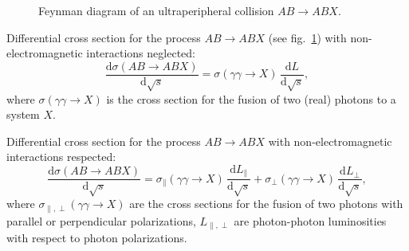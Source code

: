 \documentclass[a4paper,12pt]{article}
\begin{document}
\begin{figure}[tbh]
  \centering
  \caption{Feynman diagram of an ultraperipheral collision $AB \to ABX$.}
  \label{f:upc}
\end{figure}
Differential cross section for the process $AB \to ABX$ (see fig.~\ref{f:upc})
with non-electromagnetic interactions neglected:
\begin{equation}
  \frac{\mathrm{d} \sigma(AB \to ABX)}{\mathrm{d} \sqrt{s}}
  = \sigma(\gamma \gamma \to X) \, \frac{\mathrm{d} L}{\mathrm{d} \sqrt{s}},
\end{equation}
where $\sigma(\gamma \gamma \to X)$ is the cross section for the fusion of two
(real) photons to a system $X$.

Differential cross section for the process $AB \to ABX$ with non-electromagnetic
interactions respected:
\begin{equation}
  \frac{\mathrm{d} \sigma(AB \to ABX)}{\mathrm{d} \sqrt{s}}
  = \sigma_\parallel(\gamma \gamma \to X)
    \, \frac{\mathrm{d} L_\parallel}{\mathrm{d} \sqrt{s}}
  + \sigma_\perp(\gamma \gamma \to X)
    \, \frac{\mathrm{d} L_\perp}{\mathrm{d} \sqrt{s}},
\end{equation}
where $\sigma_{\parallel,\perp}(\gamma \gamma \to X)$ are the cross sections for
the fusion of two photons with parallel or perpendicular polarizations,
$L_{\parallel,\perp}$ are photon-photon luminosities with respect to photon
polarizations.
\end{document}
